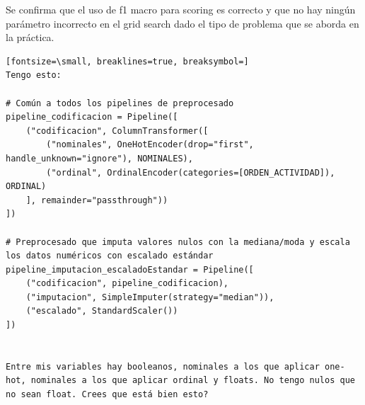 \documentclass[12pt,a4paper,oneside]{book}
\begin{document}
\begin{iaanalisis}
Se confirma que el uso de f1 macro para scoring es correcto y que no hay ningún parámetro incorrecto en el grid search dado el tipo de problema que se aborda en la práctica.
\end{iaanalisis}





\begin{iaprompt}
\begin{Verbatim}[fontsize=\small, breaklines=true, breaksymbol=]
Tengo esto:

# Común a todos los pipelines de preprocesado
pipeline_codificacion = Pipeline([
    ("codificacion", ColumnTransformer([
        ("nominales", OneHotEncoder(drop="first", handle_unknown="ignore"), NOMINALES),
        ("ordinal", OrdinalEncoder(categories=[ORDEN_ACTIVIDAD]), ORDINAL)
    ], remainder="passthrough"))
])

# Preprocesado que imputa valores nulos con la mediana/moda y escala los datos numéricos con escalado estándar
pipeline_imputacion_escaladoEstandar = Pipeline([
    ("codificacion", pipeline_codificacion),
    ("imputacion", SimpleImputer(strategy="median")),
    ("escalado", StandardScaler())
])


Entre mis variables hay booleanos, nominales a los que aplicar one-hot, nominales a los que aplicar ordinal y floats. No tengo nulos que no sean float. Crees que está bien esto?
\end{Verbatim}
\end{iaprompt}
\end{document}
